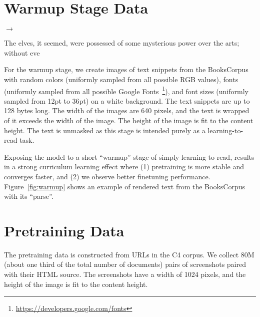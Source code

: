 \documentclass{article} \usepackage[accepted]{icml2023}
\newenvironment{code}{\snugshade\verbatim}{\endverbatim\endsnugshade}
\begin{document}
\section{Warmup Stage Data}
\label{sec:warmup_example}
\begin{figure*}[b]
\centering
\begin{minipage}{.48\textwidth}
\end{minipage}
\begin{minipage}{.05\textwidth}
\centering
\large
$\rightarrow$
\end{minipage}
\begin{minipage}{.44\textwidth}
\small
\begin{code}
The elves, it seemed, were
possessed of some mysterious
power over the arts; without eve
\end{code}
\end{minipage}
\caption{Example of input-output pairs during the warmup stage.}
\label{fig:warmup}
\end{figure*}

For the warmup stage, we create images of text snippets from the BooksCorpus~\cite{books} with random colors (uniformly sampled from all possible RGB values), fonts (uniformly sampled from all possible Google Fonts~\footnote{\url{https://developers.google.com/fonts}}), and font sizes (uniformly sampled from 12pt to 36pt) on a white background. The text snippets are up to 128 bytes long. The width of the images are 640 pixels, and the text is wrapped of it exceeds the width of the image. The height of the image is fit to the content height. The text is unmasked as this stage is intended purely as a learning-to-read task.


Exposing the model to a short “warmup” stage of simply learning to read, results in a strong curriculum learning effect where
(1) pretraining is more stable and converges faster, and (2) we observe better finetuning performance. Figure~\ref{fig:warmup} shows an example of rendered text from the BooksCorpus with its ``parse''.


\section{Pretraining Data}
\label{sec:pretraining_ex}
The pretraining data is constructed from URLs in the C4 corpus. We collect 80M (about one third of the total number of documents) pairs of screenshots paired with their HTML source. The screenshots have a width of 1024 pixels, and the height of the image is fit to the content height.
\end{document}
